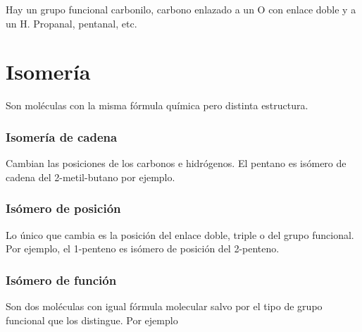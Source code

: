 Hay un grupo funcional carbonilo, carbono enlazado a un O con enlace doble y a un H. Propanal, pentanal, etc.


\section*{Isomería}

Son moléculas con la misma fórmula química pero distinta estructura.


\subsubsection*{Isomería de cadena}

Cambian las posiciones de los carbonos e hidrógenos. El pentano es isómero de cadena del 2-metil-butano por ejemplo.


\subsubsection*{Isómero de posición}

Lo único que cambia es la posición del enlace doble, triple o del grupo funcional. Por ejemplo, el 1-penteno es isómero de posición del 2-penteno.


\subsubsection*{Isómero de función}

Son dos moléculas con igual fórmula molecular salvo por el tipo de grupo funcional que los distingue. Por ejemplo 